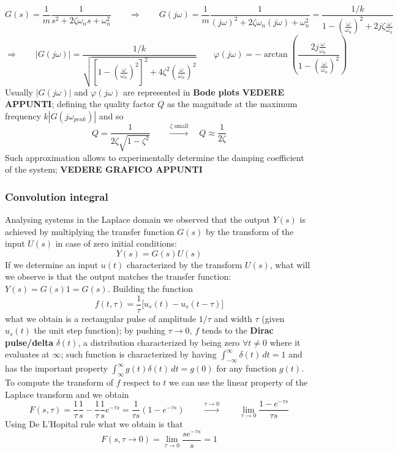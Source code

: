 		\[ G(s) = \frac 1 m \frac{1}{s^2 + 2 \zeta\omega_n s + \omega_n^2} \qquad \Rightarrow \qquad G(j\omega) = \frac 1 m \frac{1}{(j\omega)^2 + 2 \zeta \omega_n (j\omega) + \omega_n^2} = \frac{1/k}{1 - \left( \frac \omega {\omega_n} \right)^2 + 2 j \zeta \frac\omega{\omega_n} }  \]
		\[ \Rightarrow \qquad |G(j\omega)| = \frac{1/k} { \sqrt{ \left[ 1 - \left( \frac \omega {\omega_n} \right)^2  \right]^2 + 4 \zeta^2 \left(\frac \omega {\omega_n}\right)^2 }  }  \qquad \varphi(j\omega) = - \arctan\left( \frac{2 j \frac{\omega}{\omega_n}}{1 -\left( \frac \omega {\omega_n}\right)^2  } \right) \]
		Usually $|G(j\omega)|$ and $\varphi(j\omega)$ are represented in \textbf{Bode plots} \textbf{VEDERE APPUNTI}; defining the quality factor $Q$ as the magnitude at the maximum frequency $k |G(j\omega_{peak})|$ and so
		\[ Q = \frac{1}{2\zeta \sqrt{1-\zeta^2}} \qquad \xrightarrow{\zeta \textrm{ small}} \quad Q \approx \frac 1{2\zeta} \]
		Such approximation allows to experimentally determine the damping coefficient of the system; \textbf{VEDERE GRAFICO APPUNTI}
		
	
	\subsubsection{Convolution integral}
		Analysing systems in the Laplace domain we observed that the output $Y(s)$ is achieved by multiplying the transfer function $G(s)$ by the transform of the input $U(s)$ in case of zero initial conditions:
		\[ Y(s) = G(s) U(s) \]
		If we determine an input $u(t)$ characterized by the transform $U(s)$, what will we observe is that the output matches the transfer function: $Y(s) = G(s) 1 = G(s)$. Building the function
		\[ f(t,\tau) = \frac 1 \tau \Big[ u_s(t) - u_s(t-\tau) \Big] \]
		what we obtain is a rectangular pulse of amplitude $1/\tau$ and width $\tau$ (given $u_s(t)$ the unit step function); by pushing $\tau\rightarrow 0$, $f$ tends to the \textbf{Dirac pulse/delta} $\delta(t)$, a distribution characterized by being zero $\forall t \neq 0$ where it evaluates at $\infty$; such function is characterized by having $\int_{-\infty}^\infty \delta(t) \, dt = 1$ and has the important property $\int_{\infty}^{\infty} g(t) \delta(t)\, dt = g(0)$ for any function $g(t)$. To compute the transform of $f$ respect to $t$ we can use the linear property of the Laplace transform and we obtain
		\[ F(s,\tau) = \frac 1 \tau \frac 1 s - \frac 1 \tau \frac 1 s e^{-\tau s} = \frac 1{\tau s} \left( 1 -e^{-\tau s} \right) \qquad  \xrightarrow{\tau \rightarrow 0} \qquad \lim_{\tau \rightarrow 0} \frac{1-e^{-\tau s}}{\tau s} \]
		Using De L'Hopital rule what we obtain is that
		\[ F(s,\tau\rightarrow 0) = \lim_{\tau \rightarrow 0} \frac{s e^{-\tau s}}{s} = 1 \]
		
